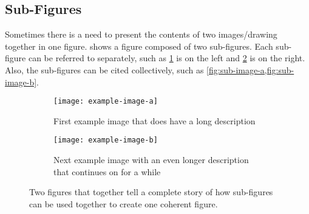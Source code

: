 \subsection{Sub-Figures}
    Sometimes there is a need to present the contents of two images/drawing together in one figure.
     shows a figure composed of two sub-figures.
    Each sub-figure can be referred to separately, such as \cref{fig:sub-image-a} is on the left and \cref{fig:sub-image-b} is on the right.
    Also, the sub-figures can be cited collectively, such as \cref{fig:sub-image-a,fig:sub-image-b}.
    \begin{figure}
        \centering
        \begin{subfigure}[t]{2in}
            \texttt{[image: example-image-a]}
            \caption{First example image that does have a long description}
            \label{fig:sub-image-a}
        \end{subfigure}
        \hspace{0.1in}
        \begin{subfigure}[t]{2in}
            \texttt{[image: example-image-b]}
            \caption{Next example image with an even longer description that continues on for a while}
            \label{fig:sub-image-b}
        \end{subfigure}
        \caption{Two figures that together tell a complete story of how sub-figures can be used together to create one coherent figure.}
        \label{fig:subfig-example}
    \end{figure}

